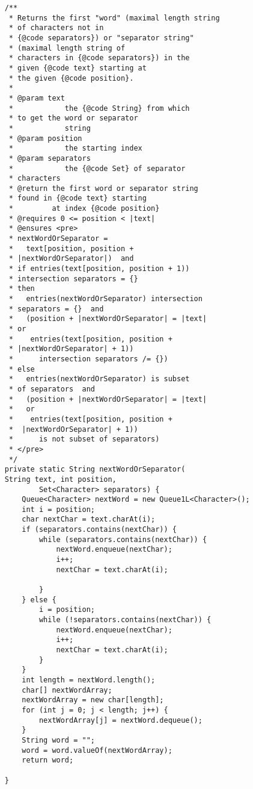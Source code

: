 \documentclass[10pt]{article}
\begin{document}
\begin{lstlisting}
    /**
     * Returns the first "word" (maximal length string
     * of characters not in
     * {@code separators}) or "separator string" 
     * (maximal length string of
     * characters in {@code separators}) in the 
     * given {@code text} starting at
     * the given {@code position}.
     *
     * @param text
     *            the {@code String} from which 
     * to get the word or separator
     *            string
     * @param position
     *            the starting index
     * @param separators
     *            the {@code Set} of separator 
     * characters
     * @return the first word or separator string 
     * found in {@code text} starting
     *         at index {@code position}
     * @requires 0 <= position < |text|
     * @ensures <pre>
     * nextWordOrSeparator =
     *   text[position, position + 
     * |nextWordOrSeparator|)  and
     * if entries(text[position, position + 1)) 
     * intersection separators = {}
     * then
     *   entries(nextWordOrSeparator) intersection 
     * separators = {}  and
     *   (position + |nextWordOrSeparator| = |text|  
     * or
     *    entries(text[position, position + 
     * |nextWordOrSeparator| + 1))
     *      intersection separators /= {})
     * else
     *   entries(nextWordOrSeparator) is subset 
     * of separators  and
     *   (position + |nextWordOrSeparator| = |text|
     *   or
     *    entries(text[position, position +
     *  |nextWordOrSeparator| + 1))
     *      is not subset of separators)
     * </pre>
     */
    private static String nextWordOrSeparator(
    String text, int position,
            Set<Character> separators) {
        Queue<Character> nextWord = new Queue1L<Character>();
        int i = position;
        char nextChar = text.charAt(i);
        if (separators.contains(nextChar)) {
            while (separators.contains(nextChar)) {
                nextWord.enqueue(nextChar);
                i++;
                nextChar = text.charAt(i);

            }
        } else {
            i = position;
            while (!separators.contains(nextChar)) {
                nextWord.enqueue(nextChar);
                i++;
                nextChar = text.charAt(i);
            }
        }
        int length = nextWord.length();
        char[] nextWordArray;
        nextWordArray = new char[length];
        for (int j = 0; j < length; j++) {
            nextWordArray[j] = nextWord.dequeue();
        }
        String word = "";
        word = word.valueOf(nextWordArray);
        return word;

    }
\end{lstlisting}
\end{document}
